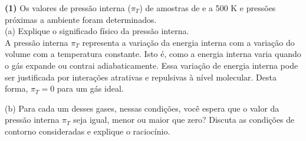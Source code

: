 \textbf{(1)} Os valores de pressão interna (\(\pi_T\)) de amostras de  e
 a 500 K e pressões próximas a ambiente foram determinados.\\

(a) Explique o significado físico da pressão interna.\\

   A pressão interna \( \pi_T \) representa a variação da energia interna com a
   variação do volume com a temperatura constante. Isto é, como a energia
   interna varia quando o gás expande ou contrai adiabaticamente. Essa variação
   de energia interna pode ser justificada por interações atrativas e repulsivas
   à nível molecular. Desta forma, \( \pi_T = 0 \) para um gás ideal. 

(b) Para cada um desses gases, nessas condições, você espera que o valor da
pressão interna \(\pi_T\)  seja igual, menor ou maior que zero? Discuta as
condições de contorno consideradas e explique o raciocínio.\\
